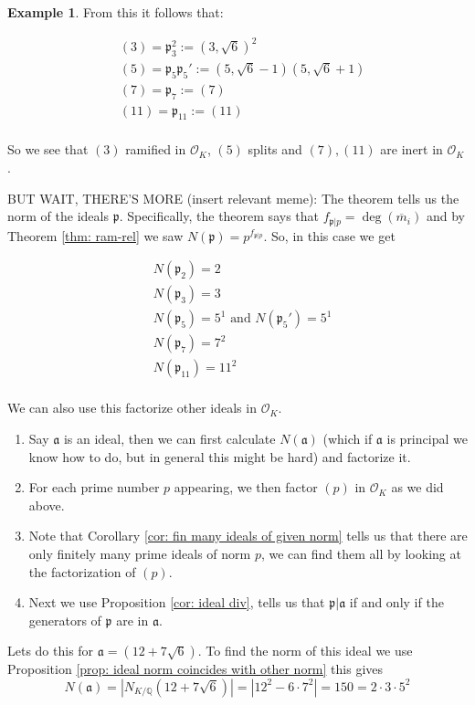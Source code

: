 \documentclass[11pt,a4paper]{report}
\theoremstyle{plain}
\theoremstyle{definition}
\newtheorem{exmp}[subsection]{Example}
\theoremstyle{definition}
\def\QQ{\mathbb{Q}}
\def\gothp{\mathfrak{p}}
\def \OO {\mathcal{O}}
\def \ov{\overline}
\def\gotha{\mathfrak{a}}
\begin{document}
\begin{exmp}
From this it follows that: 

\begin{align*}
	&(3)=\gothp_3^2:=(3,\sqrt{6})^2 \\
	&(5)=\gothp_5\gothp_5':=(5,\sqrt{6}-1)(5,\sqrt{6}+1)\\
	&(7)=\gothp_7:=(7)\\
	&(11)=\gothp_{11}:= (11)\\
\end{align*}

So we see that $(3)$ ramified in $\OO_K$, $(5)$ splits and $(7),(11)$ are inert in $\OO_K$.	

BUT WAIT, THERE'S MORE (insert relevant meme): The theorem tells us the norm of the ideals $\gothp$. Specifically, the theorem says that $f_{\gothp|p}=\deg(\ov{m}_i)$ and by Theorem \ref{thm: ram-rel} we saw $N(\gothp)=p^{f_{\gothp|p}}$.  So, in this case we get

\begin{align*}
	&N(\gothp_2)=2 \\
	&N(\gothp_3)=3 \\
	&N(\gothp_5)=5^1 \text{ and } N(\gothp_5')=5^1 \\ 
	&N(\gothp_7)=7^2 \\
	&N(\gothp_{11})=11^2 \\
\end{align*}	

We can also use this factorize other ideals in $\OO_K$.

\begin{enumerate}
	\item  Say $\gotha$ is an ideal, then we can first calculate $N(\gotha)$ (which if $\gotha$ is principal we know how to do, but in general this might be hard) and factorize it.
	\item For each prime number $p$ appearing, we then factor $(p)$ in $\OO_K$ as we did above.
	\item  Note that Corollary \ref{cor: fin many ideals of given norm} tells us that there are only finitely many prime ideals of norm $p$, we can find them all by looking at the factorization of $(p)$.
	\item Next we use Proposition \ref{cor: ideal div}, tells us that $\gothp | \gotha$ if and only if the generators of $\gothp$ are in $\gotha$.
\end{enumerate}

Lets do this for $\gotha=(12+7\sqrt{6})$. To find the norm of this ideal we use Proposition \ref{prop: ideal norm coincides with other norm} this gives \[N(\gotha)=|N_{K/\QQ}(12+7\sqrt{6})|=|12^2-6\cdot7^2|=150=2\cdot 3 \cdot 5^2\]    


\end{exmp}
\end{document}
